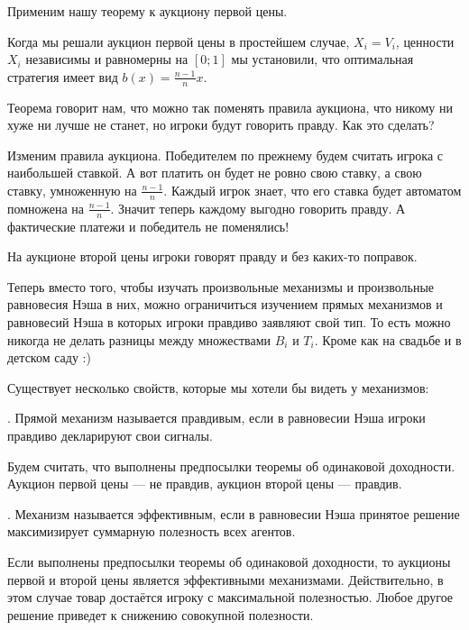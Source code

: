 Применим нашу теорему к аукциону первой цены.

\begin{myex} Когда мы решали аукцион первой цены в простейшем случае, $ X_{i}=V_{i} $, ценности $ X_{i} $ независимы и равномерны на $ [0;1] $ мы установили, что оптимальная стратегия имеет вид $ b(x)=\frac{n-1}{n} x$.

Теорема говорит нам, что можно так поменять правила аукциона, что никому ни хуже ни лучше не станет, но игроки будут говорить правду. Как это сделать?

Изменим правила аукциона. Победителем по прежнему будем считать игрока с наибольшей ставкой. А вот платить он будет не ровно свою ставку, а свою ставку, умноженную на $ \frac{n-1}{n} $. Каждый игрок знает, что его ставка будет автоматом помножена на $ \frac{n-1}{n} $. Значит теперь каждому выгодно говорить правду. А фактические платежи и победитель не поменялись!
\end{myex}

На аукционе второй цены игроки говорят правду и без каких-то поправок.

Теперь вместо того, чтобы изучать произвольные механизмы и произвольные равновесия Нэша в них, можно ограничиться изучением прямых механизмов и равновесий Нэша в которых игроки правдиво заявляют свой тип. То есть можно никогда не делать разницы между множествами $ B_{i} $ и $ T_{i} $. Кроме как на свадьбе и в детском саду :)

Существует несколько свойств, которые мы хотели бы видеть у механизмов:

\begin{mydef}
. Прямой механизм называется правдивым, если в равновесии Нэша игроки правдиво декларируют свои сигналы.
\end{mydef}

\begin{myex}
Будем считать, что выполнены предпосылки теоремы об одинаковой доходности. Аукцион первой цены — не правдив, аукцион второй цены — правдив.
\end{myex}

\begin{mydef} . Механизм называется эффективным, если в равновесии Нэша принятое решение максимизирует суммарную полезность всех агентов.
\end{mydef}

\begin{myex} Если выполнены предпосылки теоремы об одинаковой доходности, то аукционы первой и второй цены является эффективными механизмами. Действительно, в этом случае товар достаётся игроку с максимальной полезностью. Любое другое решение приведет к снижению совокупной полезности.
\end{myex}

